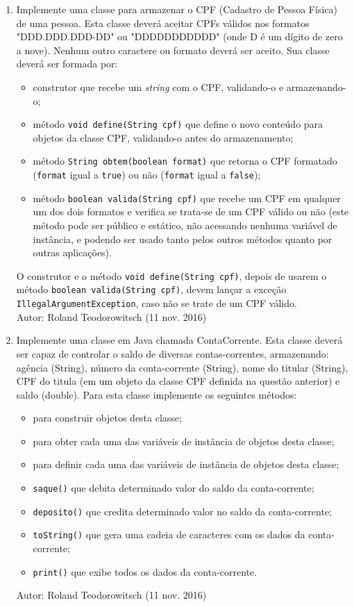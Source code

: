 \documentclass[onecolumn,a4paper,10pt]{report}
\newcommand{\+}{\, + \,}
\newcommand{\<}{\hspace*{-0.4cm}}
\begin{document}
\begin{enumerate}
\item Implemente uma classe para armazenar o CPF (Cadastro de Pessoa Física) de uma pessoa. Esta classe deverá aceitar CPFs válidos nos formatos
"DDD.DDD.DDD-DD" ou "DDDDDDDDDDD" (onde D é um dígito de zero a nove). Nenhum outro caractere ou formato deverá ser aceito. Sua classe deverá ser formada por:
\begin{itemize}
\item construtor que recebe um \emph{string} com o CPF, validando-o e armazenando-o;
\item método \texttt{void define(String cpf)} que define o novo conteúdo para objetos da classe CPF, validando-o antes do armazenamento;
\item método \texttt{String obtem(boolean format)} que retorna o CPF formatado (\texttt{format} igual a \texttt{true}) ou não (\texttt{format} igual a \texttt{false});
\item método \texttt{boolean valida(String cpf)} que recebe um CPF em qualquer um dos dois formatos e verifica se trata-se de um CPF válido ou não (este método pode ser público e estático, não acessando nenhuma variável de instância, e podendo ser usado tanto pelos outros métodos quanto por outras aplicações).
\end{itemize}
O construtor e o método \texttt{void define(String cpf)}, depois de usarem o método \texttt{boolean valida(String cpf)}, devem lançar a exceção \texttt{IllegalArgumentException}, caso não se trate de um CPF válido.\\
{\tiny Autor: Roland Teodorowitsch (11 nov. 2016)}

\item Implemente uma classe em Java chamada ContaCorrente. Esta classe deverá ser capaz de controlar o saldo de diversas contas-correntes, armazenando: agência (String), número da conta-corrente (String), nome do titular (String), CPF do titula (em um objeto da classe CPF definida na questão anterior) e saldo (double). Para esta classe implemente os seguintes métodos:
\begin{itemize}
\item para construir objetos desta classe;
\item para obter cada uma das variáveis de instância de objetos desta classe;
\item para definir cada uma das variáveis de instância de objetos desta classe;
\item \texttt{saque()} que debita determinado valor do saldo da conta-corrente;
\item \texttt{deposito()} que credita determinado valor no saldo da conta-corrente;
\item \texttt{toString()} que gera uma cadeia de caracteres com os dados da conta-corrente;
\item \texttt{print()} que exibe todos os dados da conta-corrente.
\end{itemize}
{\tiny Autor: Roland Teodorowitsch (11 nov. 2016)}


\end{enumerate}
\end{document}
